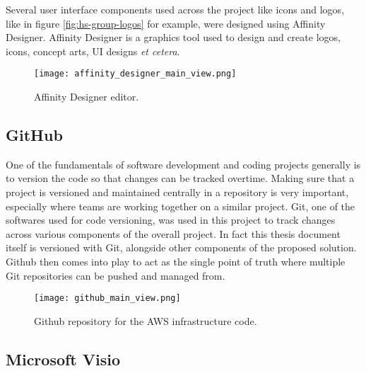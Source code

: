 Several user interface components used across the project like icons and logos, like in figure \ref{fig:hs-group-logos} for example, were designed using Affinity Designer. Affinity Designer is a graphics tool used to design and create logos, icons, concept arts, UI designs \textit{et cetera}.

\begin{figure}[H]
    \centering \texttt{[image: affinity\_designer\_main\_view.png]}
    \caption{Affinity Designer editor.}
    \label{fig:affinity-designer}
\end{figure}




\subsection{GitHub}
\label{subsec:github}

One of the fundamentals of software development and coding projects generally is to version the code so that changes can be tracked overtime. Making sure that a project is versioned and maintained centrally in a repository is very important, especially where teams are working together on a similar project. Git, one of the softwares used for code versioning, was used in this project to track changes across various components of the overall project. In fact this thesis document itself is versioned with Git, alongside other components of the proposed solution. Github then comes into play to act as the single point of truth where multiple Git repositories can be pushed and managed from.

\begin{figure}[H]
    \centering \texttt{[image: github\_main\_view.png]}
    \caption{Github repository for the AWS infrastructure code.}
    \label{fig:github}
\end{figure}



\subsection{Microsoft Visio}
\label{subsec:ms-visio}

